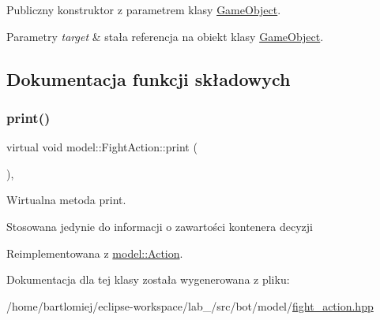 Publiczny konstruktor z parametrem klasy \hyperlink{classmodel_1_1GameObject}{Game\+Object}. 


\begin{DoxyParams}{Parametry}
{\em target} & stała referencja na obiekt klasy \hyperlink{classmodel_1_1GameObject}{Game\+Object}. \\
\hline
\end{DoxyParams}


\subsection{Dokumentacja funkcji składowych}
\mbox{\label{classmodel_1_1FightAction_a416846e68a9aa998412da4d439dbc6cc}} 
\subsubsection{\texorpdfstring{print()}{print()}}
{\footnotesize\ttfamily virtual void model\+::\+Fight\+Action\+::print (\begin{DoxyParamCaption}{ }\end{DoxyParamCaption})\hspace{0.3cm}{\ttfamily [inline]}, {\ttfamily [virtual]}}



Wirtualna metoda print. 

Stosowana jedynie do informacji o zawartości kontenera decyzji 

Reimplementowana z \hyperlink{classmodel_1_1Action_a2955dbb4a69e38a48aa07d730fe2d77c}{model\+::\+Action}.



Dokumentacja dla tej klasy została wygenerowana z pliku\+:\begin{DoxyCompactItemize}
\item 
/home/bartlomiej/eclipse-\/workspace/lab\+\_/src/bot/model/\hyperlink{fight__action_8hpp}{fight\+\_\+action.\+hpp}\end{DoxyCompactItemize}
